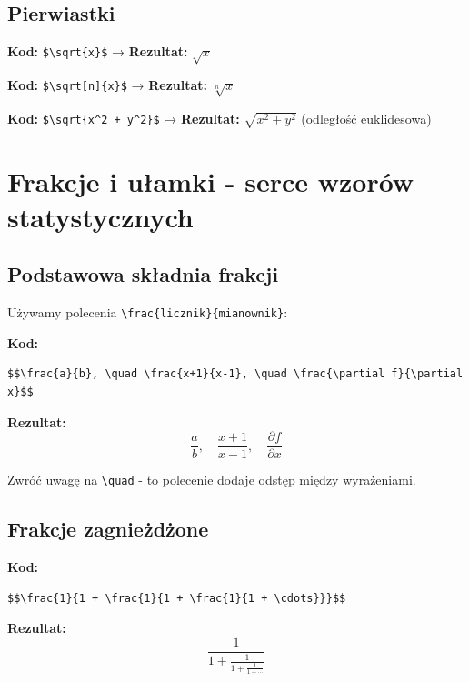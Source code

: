 \documentclass[
  polish,
  letterpaper,
  DIV=11,
  numbers=noendperiod]{scrreprt}
\begin{document}
\subsection{Pierwiastki}\label{pierwiastki}

\textbf{Kod:} \texttt{\$\textbackslash{}sqrt\{x\}\$} →
\textbf{Rezultat:} \(\sqrt{x}\)

\textbf{Kod:} \texttt{\$\textbackslash{}sqrt{[}n{]}\{x\}\$} →
\textbf{Rezultat:} \(\sqrt[n]{x}\)

\textbf{Kod:} \texttt{\$\textbackslash{}sqrt\{x\^{}2\ +\ y\^{}2\}\$} →
\textbf{Rezultat:} \(\sqrt{x^2 + y^2}\) (odległość euklidesowa)

\section{Frakcje i ułamki - serce wzorów
statystycznych}\label{frakcje-i-uux142amki---serce-wzoruxf3w-statystycznych}

\subsection{Podstawowa składnia
frakcji}\label{podstawowa-skux142adnia-frakcji}

Używamy polecenia \texttt{\textbackslash{}frac\{licznik\}\{mianownik\}}:

\textbf{Kod:}

\begin{verbatim}
$$\frac{a}{b}, \quad \frac{x+1}{x-1}, \quad \frac{\partial f}{\partial x}$$
\end{verbatim}

\textbf{Rezultat:}
\[\frac{a}{b}, \quad \frac{x+1}{x-1}, \quad \frac{\partial f}{\partial x}\]

Zwróć uwagę na \texttt{\textbackslash{}quad} - to polecenie dodaje
odstęp między wyrażeniami.

\subsection{Frakcje zagnieżdżone}\label{frakcje-zagnieux17cdux17cone}

\textbf{Kod:}

\begin{verbatim}
$$\frac{1}{1 + \frac{1}{1 + \frac{1}{1 + \cdots}}}$$
\end{verbatim}

\textbf{Rezultat:} \[\frac{1}{1 + \frac{1}{1 + \frac{1}{1 + \cdots}}}\]
\end{document}
